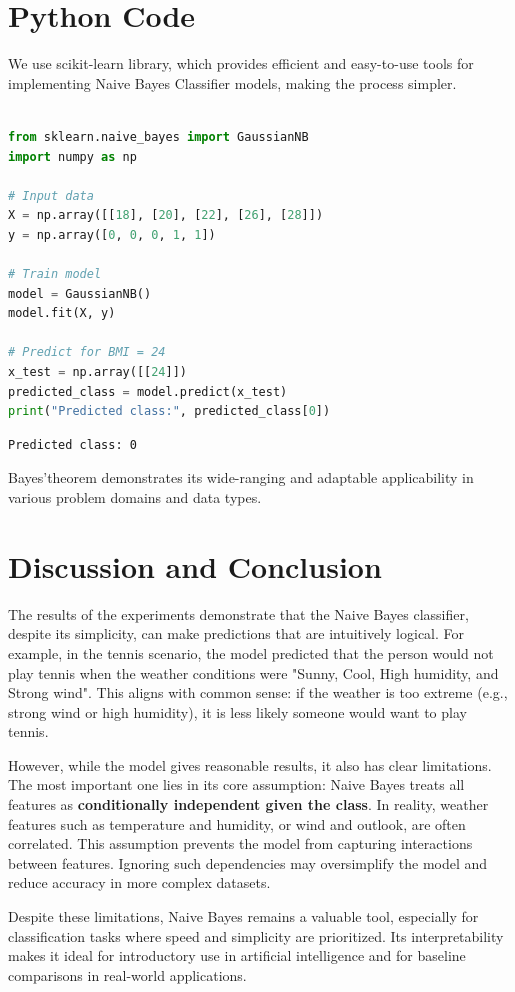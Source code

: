 \documentclass{article}
\begin{document}
\section*{Python Code}
We use scikit-learn library, which provides efficient and easy-to-use tools for implementing Naive Bayes Classifier models, making the process simpler.
\begin{lstlisting}[language=Python, caption={NBC For Continuous Random Variable}]

from sklearn.naive_bayes import GaussianNB
import numpy as np

# Input data
X = np.array([[18], [20], [22], [26], [28]])
y = np.array([0, 0, 0, 1, 1])

# Train model
model = GaussianNB()
model.fit(X, y)

# Predict for BMI = 24
x_test = np.array([[24]])
predicted_class = model.predict(x_test)
print("Predicted class:", predicted_class[0])

\end{lstlisting}

\begin{lstlisting}
Predicted class: 0
\end{lstlisting}


Bayes'theorem demonstrates its wide-ranging and adaptable applicability in various problem domains and data types.


\section*{Discussion and Conclusion}

The results of the experiments demonstrate that the Naive Bayes classifier, despite its simplicity,
can make predictions that are intuitively logical. For example, in the tennis scenario,
the model predicted that the person would not play tennis when the weather conditions were "Sunny, Cool, High humidity, and Strong wind".
This aligns with common sense: if the weather is too extreme (e.g., strong wind or high humidity),
it is less likely someone would want to play tennis.

However, while the model gives reasonable results, it also has clear limitations.
The most important one lies in its core assumption: Naive Bayes treats all features as \textbf{conditionally independent given the class}.
In reality, weather features such as temperature and humidity, or wind and outlook, are often correlated.
This assumption prevents the model from capturing interactions between features.
Ignoring such dependencies may oversimplify the model and reduce accuracy in more complex datasets.

Despite these limitations, Naive Bayes remains a valuable tool, especially for classification tasks where speed and simplicity are prioritized.
Its interpretability makes it ideal for introductory use in artificial intelligence and for baseline comparisons in real-world applications.
\end{document}
